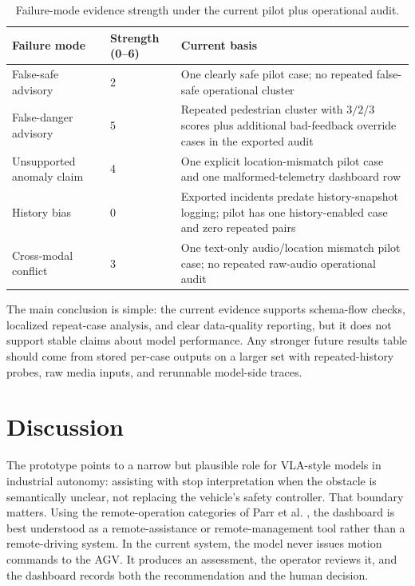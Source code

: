 \documentclass[conference]{IEEEtran}
\begin{document}
\begin{table}[t]
\caption{Failure-mode evidence strength under the current pilot plus operational audit.}
\label{tab:failure}
\centering
\footnotesize
\begin{tabularx}{\linewidth}{@{}lXX@{}}
\toprule
Failure mode & Strength (0--6) & Current basis \\
\midrule
False-safe advisory & 2 & One clearly safe pilot case; no repeated false-safe operational cluster \\
False-danger advisory & 5 & Repeated pedestrian cluster with \(3/2/3\) scores plus additional bad-feedback override cases in the exported audit \\
Unsupported anomaly claim & 4 & One explicit location-mismatch pilot case and one malformed-telemetry dashboard row \\
History bias & 0 & Exported incidents predate history-snapshot logging; pilot has one history-enabled case and zero repeated pairs \\
Cross-modal conflict & 3 & One text-only audio/location mismatch pilot case; no repeated raw-audio operational audit \\
\bottomrule
\end{tabularx}
\end{table}

\noindent The main conclusion is simple: the current evidence supports schema-flow checks, localized repeat-case analysis, and clear data-quality reporting, but it does not support stable claims about model performance. Any stronger future results table should come from stored per-case outputs on a larger set with repeated-history probes, raw media inputs, and rerunnable model-side traces.

\section{Discussion}
The prototype points to a narrow but plausible role for VLA-style models in industrial autonomy: assisting with stop interpretation when the obstacle is semantically unclear, not replacing the vehicle's safety controller. That boundary matters. Using the remote-operation categories of Parr et al. \cite{parr2024remote}, the dashboard is best understood as a remote-assistance or remote-management tool rather than a remote-driving system. In the current system, the model never issues motion commands to the AGV. It produces an assessment, the operator reviews it, and the dashboard records both the recommendation and the human decision.
\end{document}
